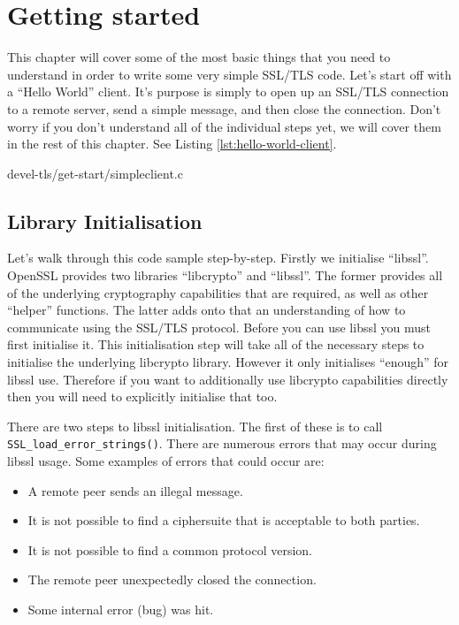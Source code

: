 \chapter{Getting started}
This chapter will cover some of the most basic things that you need to 
understand in order to write some very simple SSL/TLS code. Let's start off with
a ``Hello World'' client. It's purpose is simply to open up an SSL/TLS
connection to a remote server, send a simple message, and then close the
connection. Don't worry if you don't understand all of the individual steps yet,
we will cover them in the rest of this chapter. See Listing
\ref{lst:hello-world-client}.


{devel-tls/get-start/simpleclient.c}

\section{Library Initialisation}

Let's walk through this code sample step-by-step. Firstly we initialise 
``libssl''. OpenSSL provides two libraries ``libcrypto'' and ``libssl''. The 
former provides all of the underlying cryptography capabilities that are 
required, as well as other ``helper'' functions. The latter adds onto that an
understanding of how to communicate using the SSL/TLS protocol. Before you can 
use libssl you must first initialise it. This initialisation step will take all 
of the necessary steps to initialise the underlying libcrypto library. However 
it only initialises ``enough'' for libssl use. Therefore if you want to 
additionally use libcrypto capabilities directly then you will need to 
explicitly initialise that too.

There are two steps to libssl initialisation. The first of these is to call 
\verb!SSL_load_error_strings()!. There are numerous errors that may occur 
during libssl usage. Some examples of errors that could occur are:
\begin{itemize}
\item A remote peer sends an illegal message.
\item It is not possible to find a ciphersuite that is acceptable to both 
parties.
\item It is not possible to find a common protocol version. 
\item The remote peer unexpectedly closed the connection.
\item Some internal error (bug) was hit.
\end{itemize}

